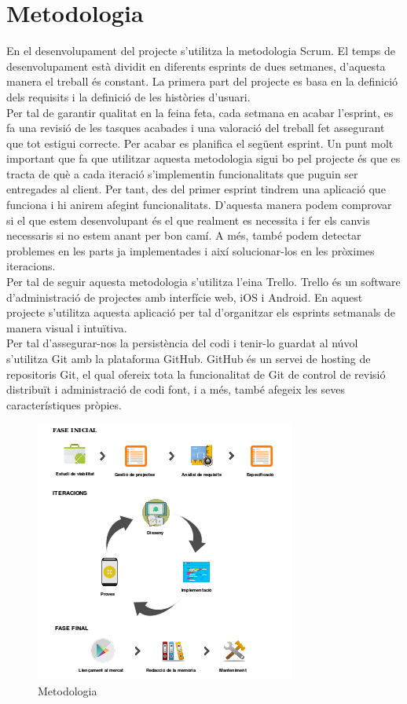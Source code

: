 \section{Metodologia}

En el desenvolupament del projecte s'utilitza la metodologia Scrum. El temps de desenvolupament està dividit en diferents esprints de dues setmanes, d'aquesta manera el treball és constant. La primera part del projecte es basa en la definició dels requisits i la definició de les històries d'usuari.\\

Per tal de garantir qualitat en la feina feta, cada setmana en acabar l'esprint, es fa una revisió de les tasques acabades i una valoració del treball fet assegurant que tot estigui correcte. Per acabar es planifica el següent esprint. Un punt molt important que fa que utilitzar aquesta metodologia sigui bo pel projecte és que es tracta de què a cada iteració s'implementin funcionalitats que puguin ser entregades al client. Per
tant, des del primer esprint tindrem una aplicació que funciona i hi anirem afegint funcionalitats. D'aquesta manera podem comprovar si el que estem desenvolupant és el que realment es necessita i fer els canvis necessaris si no estem anant per bon camí. A més, també podem detectar problemes en les parts ja implementades i així solucionar-los en les pròximes iteracions.\\

Per tal de seguir aquesta metodologia s'utilitza l'eina Trello. Trello és un software d'administració de projectes amb interfície web, iOS i Android. En aquest projecte s'utilitza aquesta aplicació per tal d'organitzar els esprints setmanals de manera visual i intuïtiva.\\

Per tal d'assegurar-nos la persistència del codi i tenir-lo guardat al núvol s'utilitza Git amb la plataforma GitHub. GitHub és un servei de hosting de repositoris Git, el qual ofereix tota la funcionalitat de Git de control de revisió distribuït i administració de codi font, i a més, també afegeix les seves característiques pròpies.

\begin{figure}[!h]
\centering
\includegraphics[scale=1]{Figures/metodologia.png}
\caption{Metodologia}
\end{figure}


